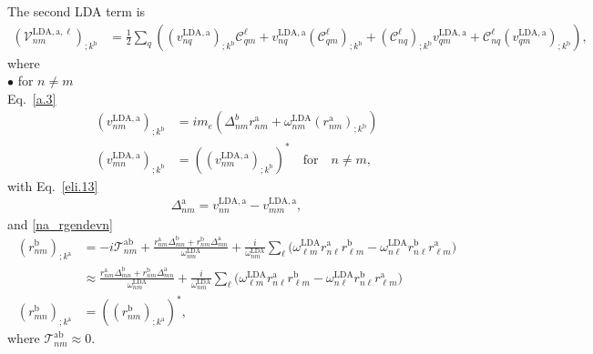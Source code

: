  The second LDA term is
\begin{align}\label{c-a.2n}
\left(\mathcal{V}^{\mathrm{LDA},\mathrm{a},\ell}_{nm}\right)_{;k^\mathrm{b}}
&=
\frac{1}{2}\sum_q\left(
(v^{\mathrm{LDA},\mathrm{a}}_{nq})_{;k^\mathrm{b}}\mathcal{C}^\ell_{qm}
+  
v^{\mathrm{LDA},\mathrm{a}}_{nq}(\mathcal{C}^\ell_{qm})_{;k^\mathrm{b}}
+
(\mathcal{C}^\ell_{nq})_{;k^\mathrm{b}} v^{\mathrm{LDA},\mathrm{a}}_{qm}
+
\mathcal{C}^\ell_{nq} (v^{\mathrm{LDA},\mathrm{a}}_{qm})_{;k^\mathrm{b}}
\right)
,
\end{align}  
where\\
$\bullet$ for $n\ne m$\\
Eq.~\eqref{a.3}
\begin{align}\label{c-a.3}
(v^{\mathrm{LDA},\mathrm{a}}_{nm})_{;k^\mathrm{b}}
&=  
im_e\left(\Delta^b_{nm}r^\mathrm{a}_{nm}
+ 
\omega^\mathrm{LDA}_{nm}(r^\mathrm{a}_{nm})_{;k^\mathrm{b}}
\right)
\nonumber\\
(v^{\mathrm{LDA},\mathrm{a}}_{mn})_{;k^\mathrm{b}}
&=
\left((v^{\mathrm{LDA},\mathrm{a}}_{nm})_{;k^\mathrm{b}}\right)^*
\quad\mathrm{for}\quad n\ne m
,
\end{align} 
with
Eq.~\eqref{eli.13}
\begin{align}\label{c-eli.13}
\Delta_{nm}^{\mathrm{a}}
=
v_{nn}^{\mathrm{LDA},\mathrm{a}}-v_{mm}^{\mathrm{LDA},\mathrm{a}}
,
\end{align}
and \eqref{na_rgendevn}
\begin{align}\label{c-na_rgendevn}
(r^{\mathrm{b}}_{nm})_{;k^{\mathrm{a}}}
&=
-i\mathcal{T}^{\mathrm{a}\mathrm{b}}_{nm}
+
\frac{
r^{\mathrm{a}}_{nm}
\Delta^{\mathrm{b}}_{mn}
+r^{\mathrm{b}}_{nm}
\Delta^{\mathrm{a}}_{mn}
}
{\omega^\mathrm{LDA}_{nm}}
+
\frac{i}{\omega^\mathrm{LDA}_{nm}}
\sum_{\ell}
\bigg(
\omega^\mathrm{LDA}_{\ell m}
r^{\mathrm{a}}_{n\ell}
r^{\mathrm{b}}_{\ell m}
-
\omega^\mathrm{LDA}_{n\ell}
r^{\mathrm{b}}_{n\ell}
r^{\mathrm{a}}_{\ell m}
\bigg)
\nonumber\\
&\approx
\frac{
r^{\mathrm{a}}_{nm}
\Delta^{\mathrm{b}}_{mn}
+r^{\mathrm{b}}_{nm}
\Delta^{\mathrm{a}}_{mn}
}
{\omega^\mathrm{LDA}_{nm}}
+
\frac{i}{\omega^\mathrm{LDA}_{nm}}
\sum_{\ell}
\bigg(
\omega^\mathrm{LDA}_{\ell m}
r^{\mathrm{a}}_{n\ell}
r^{\mathrm{b}}_{\ell m}
-
\omega^\mathrm{LDA}_{n\ell}
r^{\mathrm{b}}_{n\ell}
r^{\mathrm{a}}_{\ell m}
\bigg)
\nonumber\\
(r^{\mathrm{b}}_{mn})_{;k^{\mathrm{a}}}
&=
\left((r^{\mathrm{b}}_{nm})_{;k^{\mathrm{a}}}\right)^*
,
\end{align}
where $\mathcal{T}^{\mathrm{a}\mathrm{b}}_{nm}\approx 0$.\\
